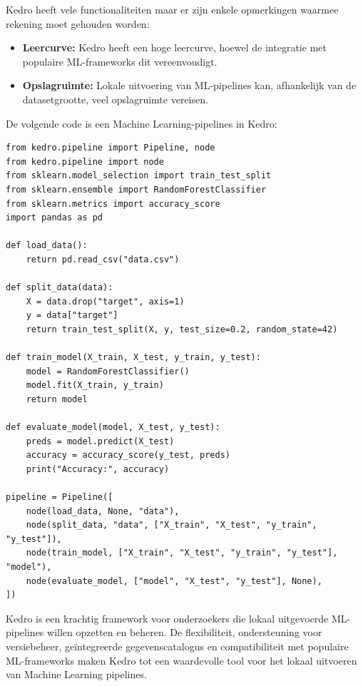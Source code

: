 Kedro heeft vele functionaliteiten maar er zijn enkele opmerkingen waarmee rekening moet gehouden worden:

\begin{itemize}
    \item \textbf{Leercurve:} Kedro heeft een hoge leercurve, hoewel de integratie met populaire ML-frameworks dit vereenvoudigt.
    \item \textbf{Opslagruimte:} Lokale uitvoering van ML-pipelines kan, afhankelijk van de datasetgrootte, veel opslagruimte vereisen.
\end{itemize}


De volgende code is een Machine Learning-pipelines in Kedro: 

\begin{verbatim}
from kedro.pipeline import Pipeline, node
from kedro.pipeline import node
from sklearn.model_selection import train_test_split
from sklearn.ensemble import RandomForestClassifier
from sklearn.metrics import accuracy_score
import pandas as pd

def load_data():
    return pd.read_csv("data.csv")

def split_data(data):
    X = data.drop("target", axis=1)
    y = data["target"]
    return train_test_split(X, y, test_size=0.2, random_state=42)

def train_model(X_train, X_test, y_train, y_test):
    model = RandomForestClassifier()
    model.fit(X_train, y_train)
    return model

def evaluate_model(model, X_test, y_test):
    preds = model.predict(X_test)
    accuracy = accuracy_score(y_test, preds)
    print("Accuracy:", accuracy)

pipeline = Pipeline([
    node(load_data, None, "data"),
    node(split_data, "data", ["X_train", "X_test", "y_train", "y_test"]),
    node(train_model, ["X_train", "X_test", "y_train", "y_test"], "model"),
    node(evaluate_model, ["model", "X_test", "y_test"], None),
])

\end{verbatim}

Kedro is een krachtig framework voor onderzoekers die lokaal uitgevoerde ML-pipelines willen opzetten en beheren. De flexibiliteit, ondersteuning voor versiebeheer, geïntegreerde gegevenscatalogus en compatibiliteit met populaire ML-frameworks maken Kedro tot een waardevolle tool voor het lokaal uitvoeren van Machine Learning pipelines.

